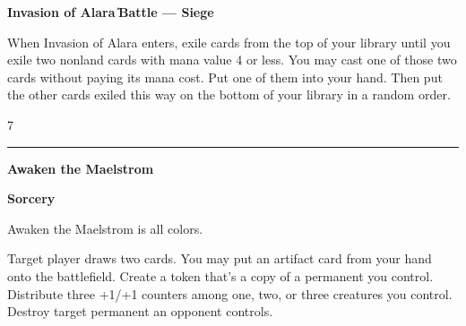 \documentclass[8pt]{extarticle}
\begin{document}
{\large\textbf{Invasion of Alara}}
\hfill
\W\U\B\R\G

\textbf{Battle — Siege}

When Invasion of Alara enters, exile cards from the top of your library until you exile two nonland cards with mana value 4 or less. You may cast one of those two cards without paying its mana cost. Put one of them into your hand. Then put the other cards exiled this way on the bottom of your library in a random order.

\hfill7

\vfill
\hrule
\vfill

{\large\textbf{Awaken the Maelstrom}}

\textbf{Sorcery}

Awaken the Maelstrom is all colors.

Target player draws two cards. You may put an artifact card from your hand onto the battlefield. Create a token that's a copy of a permanent you control. Distribute three +1/+1 counters among one, two, or three creatures you control. Destroy target permanent an opponent controls.
\end{document}
